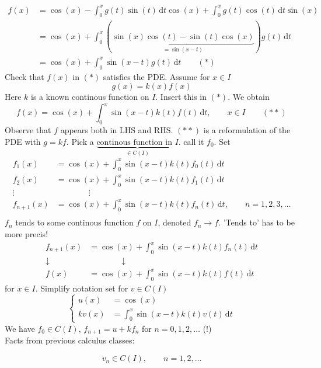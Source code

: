 \begin{enumerate}[1.]
	\begin{align*}
		f(x) &= \cos(x) - \int_{0}^{x} g(t) \sin(t) \,\mathrm{d}t \cos(x) + \int_{0}^{x} g(t) \cos(t) \,\mathrm{d}t \sin(x) \\
		&= \cos(x) + \int_{0}^{x} (\underset{=\sin(x-t)}{\underbrace{\sin(x)\cos(t)- \sin(t)\cos(x)}})g(t) \,\mathrm{d}t \\
		&= \cos(x) + \int_{0}^{x}\sin(x-t)g(t) \,\mathrm{d}t \qquad (*)
	\end{align*}
	Check that $f(x)$ in $(*)$ satisfies the PDE.
	Assume for $x \in I$
	\[
		g(x) = k(x)f(x)
	\]
	Here $k$ is a known continous function on $I$. Insert this in $(*)$. We obtain
	\[
		f(x) = \cos(x) + \int_{0}^{x} \sin(x-t)k(t)f(t) \,\mathrm{d}t, \qquad x \in I \qquad (**)
	\]
	Observe that $f$ appears both in LHS and RHS. $(**)$ is a reformulation of the PDE with $g=kf$. Pick a $\underset{\in C(I)}{\underbrace{\text{continous function in $I$}}}$. call it $f_0$. Set
	\begin{align*}
		f_1(x) &= \cos(x) + \int_{0}^{x}\sin(x-t)k(t)f_0(t) \,\mathrm{d}t \\
		f_2(x) &= \cos(x) + \int_{0}^{x}\sin(x-t)k(t)f_1(t) \,\mathrm{d}t \\
		\vdots &\qquad \qquad  \vdots \\
		f_{n+1}(x) &= \cos(x) + \int_{0}^{x}\sin(x-t)k(t)f_n(t) \,\mathrm{d}t, \qquad n=1,2,3, \dots \\
	\end{align*}
	 $f_n$ tends to some continous function $f$ on $I$, denoted $f_n \to f$. 'Tends to' has to be more precis! 
	\begin{align*}
		f_{n+1}(x) &= \cos(x) + \int_{0}^{x} \sin(x-t)k(t)f_n(t) \,\mathrm{d}t \\
		\downarrow & \qquad \qquad \downarrow \\
		f(x) &= \cos(x) + \int_{0}^{x} \sin(x-t)k(t)f(t) \,\mathrm{d}t
	\end{align*}
	for $x \in I$. Simplify notation set for $v \in C(I)$
	\[
		\begin{cases}
			u(x)&=\cos(x)\\
			kv(x)&= \int_{0}^{x} \sin(x-t)k(t)v(t) \,\mathrm{d}t
		\end{cases}
	\]
	We have $f_0 \in C(I)$, $f_{n+1}=u + k f_n$ for $n=0,1,2, \dots$ (!) \\
	Facts from previous calculus classes:
	\begin{definition*}
		\[
			v_n \in C(I), \qquad n=1,2,\dots
\]
\end{definition*}
\end{enumerate}
